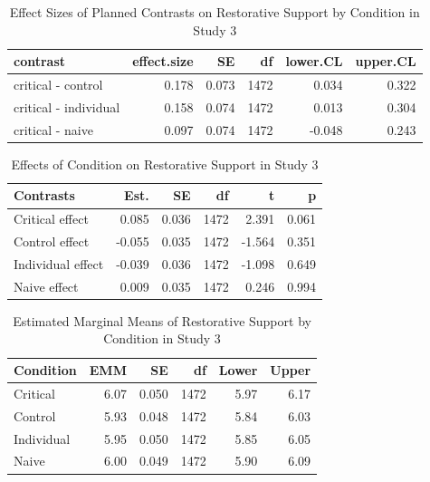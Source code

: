 \documentclass[
]{book}
\begin{document}
\begin{table}

\caption{\label{tab:rest-contrast-s3}Effect Sizes of Planned Contrasts on Restorative Support by Condition in Study 3}
\centering
\fontsize{13}{15}\selectfont
\begin{tabular}[t]{lrrrrr}
\toprule
contrast & effect.size & SE & df & lower.CL & upper.CL\\
\midrule
critical - control & 0.178 & 0.073 & 1472 & 0.034 & 0.322\\
critical - individual & 0.158 & 0.074 & 1472 & 0.013 & 0.304\\
critical - naive & 0.097 & 0.074 & 1472 & -0.048 & 0.243\\
\bottomrule
\end{tabular}
\end{table}

\begin{table}

\caption{\label{tab:rest-contrast-s3}Effects of Condition on Restorative Support in Study 3}
\centering
\begin{tabular}[t]{lrrrrr}
\toprule
Contrasts & Est. & SE & df & t & p\\
\midrule
Critical effect & 0.085 & 0.036 & 1472 & 2.391 & 0.061\\
Control effect & -0.055 & 0.035 & 1472 & -1.564 & 0.351\\
Individual effect & -0.039 & 0.036 & 1472 & -1.098 & 0.649\\
Naive effect & 0.009 & 0.035 & 1472 & 0.246 & 0.994\\
\bottomrule
\end{tabular}
\end{table}

\begin{table}

\caption{\label{tab:rest-contrast-s3}Estimated Marginal Means of Restorative Support by Condition in Study 3}
\centering
\begin{tabular}[t]{lrrrrr}
\toprule
Condition & EMM & SE & df & Lower & Upper\\
\midrule
Critical & 6.07 & 0.050 & 1472 & 5.97 & 6.17\\
Control & 5.93 & 0.048 & 1472 & 5.84 & 6.03\\
Individual & 5.95 & 0.050 & 1472 & 5.85 & 6.05\\
Naive & 6.00 & 0.049 & 1472 & 5.90 & 6.09\\
\bottomrule
\end{tabular}
\end{table}
\end{document}
